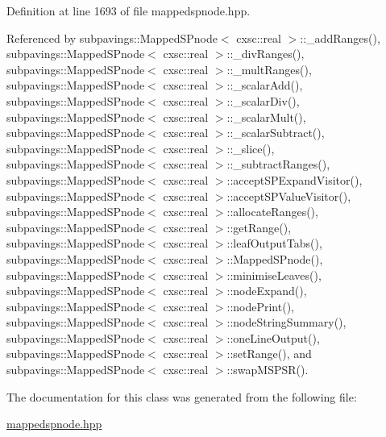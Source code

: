 \-Definition at line 1693 of file mappedspnode.\-hpp.



\-Referenced by subpavings\-::\-Mapped\-S\-Pnode$<$ cxsc\-::real $>$\-::\-\_\-add\-Ranges(), subpavings\-::\-Mapped\-S\-Pnode$<$ cxsc\-::real $>$\-::\-\_\-div\-Ranges(), subpavings\-::\-Mapped\-S\-Pnode$<$ cxsc\-::real $>$\-::\-\_\-mult\-Ranges(), subpavings\-::\-Mapped\-S\-Pnode$<$ cxsc\-::real $>$\-::\-\_\-scalar\-Add(), subpavings\-::\-Mapped\-S\-Pnode$<$ cxsc\-::real $>$\-::\-\_\-scalar\-Div(), subpavings\-::\-Mapped\-S\-Pnode$<$ cxsc\-::real $>$\-::\-\_\-scalar\-Mult(), subpavings\-::\-Mapped\-S\-Pnode$<$ cxsc\-::real $>$\-::\-\_\-scalar\-Subtract(), subpavings\-::\-Mapped\-S\-Pnode$<$ cxsc\-::real $>$\-::\-\_\-slice(), subpavings\-::\-Mapped\-S\-Pnode$<$ cxsc\-::real $>$\-::\-\_\-subtract\-Ranges(), subpavings\-::\-Mapped\-S\-Pnode$<$ cxsc\-::real $>$\-::accept\-S\-P\-Expand\-Visitor(), subpavings\-::\-Mapped\-S\-Pnode$<$ cxsc\-::real $>$\-::accept\-S\-P\-Value\-Visitor(), subpavings\-::\-Mapped\-S\-Pnode$<$ cxsc\-::real $>$\-::allocate\-Ranges(), subpavings\-::\-Mapped\-S\-Pnode$<$ cxsc\-::real $>$\-::get\-Range(), subpavings\-::\-Mapped\-S\-Pnode$<$ cxsc\-::real $>$\-::leaf\-Output\-Tabs(), subpavings\-::\-Mapped\-S\-Pnode$<$ cxsc\-::real $>$\-::\-Mapped\-S\-Pnode(), subpavings\-::\-Mapped\-S\-Pnode$<$ cxsc\-::real $>$\-::minimise\-Leaves(), subpavings\-::\-Mapped\-S\-Pnode$<$ cxsc\-::real $>$\-::node\-Expand(), subpavings\-::\-Mapped\-S\-Pnode$<$ cxsc\-::real $>$\-::node\-Print(), subpavings\-::\-Mapped\-S\-Pnode$<$ cxsc\-::real $>$\-::node\-String\-Summary(), subpavings\-::\-Mapped\-S\-Pnode$<$ cxsc\-::real $>$\-::one\-Line\-Output(), subpavings\-::\-Mapped\-S\-Pnode$<$ cxsc\-::real $>$\-::set\-Range(), and subpavings\-::\-Mapped\-S\-Pnode$<$ cxsc\-::real $>$\-::swap\-M\-S\-P\-S\-R().



\-The documentation for this class was generated from the following file\-:\begin{DoxyCompactItemize}
\item 
\hyperlink{mappedspnode_8hpp}{mappedspnode.\-hpp}\end{DoxyCompactItemize}
